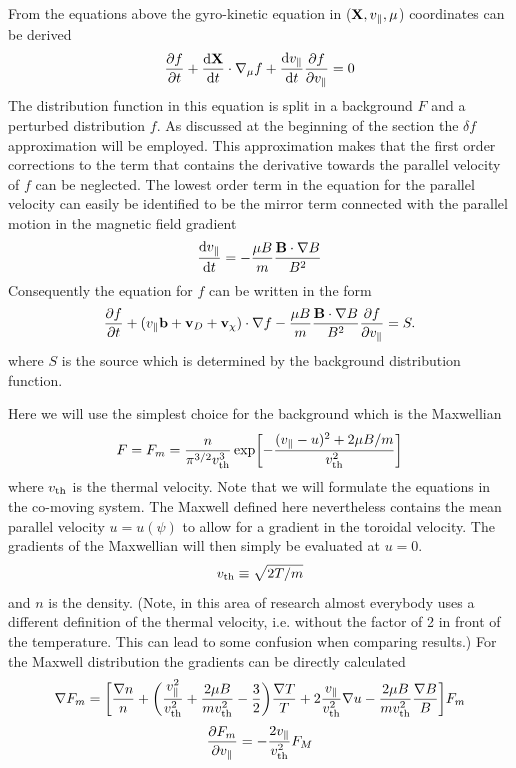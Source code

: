 \documentclass{report}
\def\be{\begin{equation}}
\def\ee{\end{equation}}
\begin{document}
From the equations above the gyro-kinetic equation in (${\bf X}, v_\parallel, 
\mu$) coordinates can be derived 
\be 
{\partial f \over \partial t} + {{\rm d} {\bf X} \over {\rm d} t} \cdot \nabla_\mu 
f + {{\rm d} v_\parallel \over {\rm d} t} {\partial f \over \partial v_\parallel} = 0
\ee 
The distribution function in this equation is split in a background $F$ and a perturbed 
distribution $f$. As discussed at the beginning of the section the $\delta f$ approximation 
will be employed. This approximation makes that the first order corrections to the term 
that contains the derivative towards the parallel velocity of $f$ can be neglected. 
The lowest order term in the equation for the parallel velocity can easily be identified 
to be the mirror term connected with the parallel motion in the magnetic field gradient 
\be 
{{\rm d} v_\parallel \over {\rm d} t} =   -{\mu B\over m } {{\bf B} \cdot \nabla B \over 
B^2 }
\ee
Consequently the equation for $f$ can be written in the form 
\be 
{\partial f \over \partial t} + (v_\parallel {\bf b} + {\bf v}_D + {\bf v}_\chi) \cdot \nabla f  
-{\mu B \over m}{{\bf B}\cdot \nabla B \over B^2}{\partial f \over \partial v_\parallel} = S. 
\ee
where $S$ is the source which is determined by the background distribution function. 

Here we will use the simplest choice for the background which is the Maxwellian 
\be 
F = F_m = {n \over \pi^{3/2} v_{\rm th}^3 } \exp \biggl [ - {(v_\parallel-u )^2 + 2 \mu B / m \over v_{\rm th}^2} \biggr ] 
\ee 
where $v_{\rm th}$ is the thermal velocity. Note that we will formulate the equations in the co-moving 
system. The Maxwell defined here nevertheless contains the mean parallel velocity $u = u(\psi)$ to 
allow for a gradient in the toroidal velocity. The gradients of the Maxwellian will then simply be 
evaluated at $u = 0$. 
\be 
v_{\rm th} \equiv \sqrt{ 2 T / m} 
\ee
and $n$ is the density. (Note, in this area of research almost everybody uses a different definition of the 
thermal velocity, i.e. without the factor of 2 in front of the temperature. This can lead to some 
confusion when comparing results.) For the Maxwell distribution the gradients can be directly calculated 
\be
\nabla F_m = \biggl [ {\nabla n \over n} + \biggl ( { v_\parallel^{2} \over 
v_{\rm th}^2} + { 2 \mu B \over m v_{\rm th}^2} 
- {3\over 2} \biggr ) {\nabla T \over T}  + 2 {v_\parallel \over 
v_{\rm th}^{2}} \nabla u - {2 \mu B \over m v_{\rm th}^2} 
{\nabla B \over B} \biggr ]  F_m  
\ee
\be 
{\partial F_m \over \partial v_\parallel} = - {2 v_\parallel \over v_{\rm th}^2} F_M 
\ee
\end{document}
